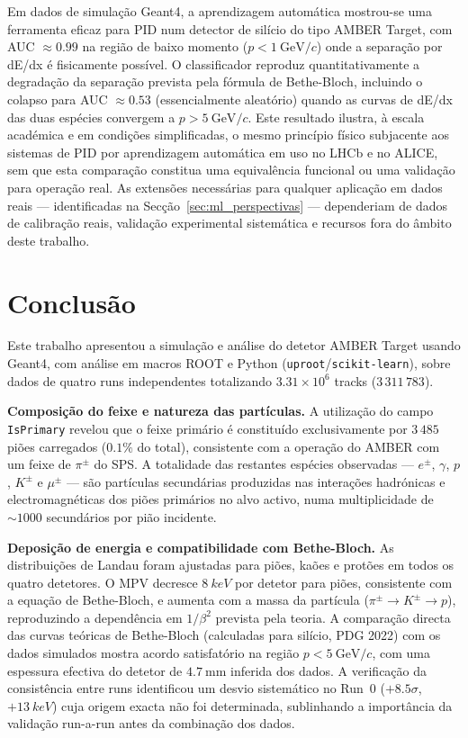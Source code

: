 \documentclass[12pt,a4paper]{article}
\begin{document}
Em dados de simulação Geant4, a aprendizagem automática mostrou-se uma
ferramenta eficaz para PID num detector de silício do tipo AMBER Target,
com AUC $\approx 0.99$ na região de baixo momento ($p < 1~\text{GeV}/c$)
onde a separação por dE/dx é fisicamente possível. O classificador reproduz
quantitativamente a degradação da separação prevista pela fórmula de
Bethe-Bloch, incluindo o colapso para AUC $\approx 0.53$ (essencialmente
aleatório) quando as curvas de dE/dx das duas espécies convergem a
$p > 5~\text{GeV}/c$. Este resultado ilustra, à escala académica e em condições simplificadas,
o mesmo princípio físico subjacente aos sistemas de PID por aprendizagem
automática em uso no LHCb e no ALICE, sem que esta comparação constitua
uma equivalência funcional ou uma validação para operação real.
As extensões necessárias para qualquer aplicação em dados reais ---
identificadas na Secção~\ref{sec:ml_perspectivas} --- dependeriam de dados
de calibração reais, validação experimental sistemática e recursos fora do
âmbito deste trabalho.

\section{Conclusão}

Este trabalho apresentou a simulação e análise do detetor AMBER Target usando
Geant4, com análise em macros ROOT e Python (\texttt{uproot}/\texttt{scikit-learn}),
sobre dados de quatro runs independentes totalizando
$3.31 \times 10^6$ tracks ($3\,311\,783$).

\textbf{Composição do feixe e natureza das partículas.}
A utilização do campo \texttt{IsPrimary} revelou que o feixe primário é
constituído exclusivamente por $3\,485$ piões carregados ($0.1\%$ do total),
consistente com a operação do AMBER com um feixe de $\pi^\pm$ do SPS.
A totalidade das restantes espécies observadas --- $e^\pm$, $\gamma$, $p$,
$K^\pm$ e $\mu^\pm$ --- são partículas secundárias produzidas nas interações
hadrónicas e electromagnéticas dos piões primários no alvo activo, numa
multiplicidade de $\sim 1000$ secundários por pião incidente.

\textbf{Deposição de energia e compatibilidade com Bethe-Bloch.}
As distribuições de Landau foram ajustadas para piões, kaões e protões em
todos os quatro detetores. O MPV decresce $\SI{8}{keV}$ por detetor para piões,
consistente com a equação de Bethe-Bloch, e aumenta com a massa da partícula
($\pi^\pm \to K^\pm \to p$), reproduzindo a dependência em $1/\beta^2$ prevista
pela teoria. A comparação directa das curvas teóricas de Bethe-Bloch (calculadas
para silício, PDG 2022) com os dados simulados mostra acordo satisfatório na
região $p < 5~\text{GeV}/c$, com uma espessura efectiva do detetor de
$4.7~\text{mm}$ inferida dos dados. A verificação da consistência entre runs
identificou um desvio sistemático no Run~0 ($+8.5\sigma$, $+\SI{13}{keV}$)
cuja origem exacta não foi determinada, sublinhando a importância da
validação run-a-run antes da combinação dos dados.
\end{document}
